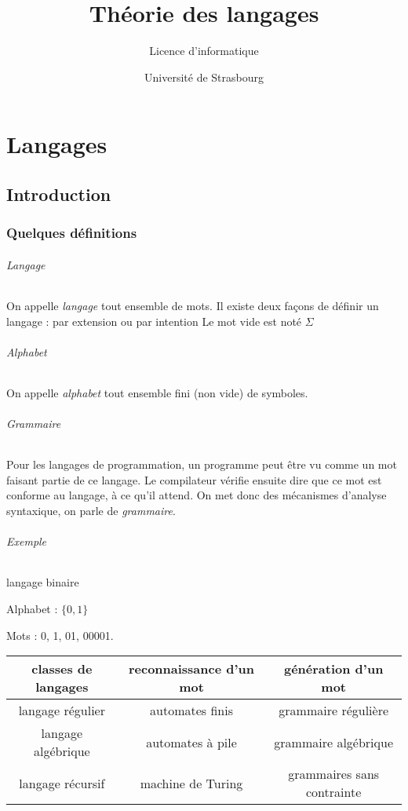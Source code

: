 \documentclass[12pt, a4paper]{report}
\title{Théorie des langages}
\author{Licence d'informatique}
\date{Université de Strasbourg}
\begin{document}
\maketitle

\part{Langages}

\chapter{Introduction}

\section*{Quelques définitions}

\paragraph{Langage} On appelle \textit{langage} tout ensemble de mots. Il existe deux façons de définir un langage : par extension ou par intention Le mot vide est noté $\Sigma$

\paragraph{Alphabet} On appelle \textit{alphabet} tout ensemble fini (non vide) de symboles.


\paragraph{Grammaire} 

Pour les langages de programmation, un programme peut être vu comme un
mot faisant partie de ce langage. Le compilateur vérifie ensuite dire
que ce mot est conforme au langage, à ce qu’il attend. On met donc des
mécanismes d’analyse syntaxique, on parle de \textit{grammaire}.


\paragraph{Exemple} langage binaire

Alphabet : $\{0, 1\}$

Mots : 0, 1, 01, 00001.


\begin{center}
\begin{tabular}{|c|c|c|}
\hline
classes de langages & reconnaissance d'un mot & génération d'un mot \\ \hline \hline
langage régulier  & automates finis & grammaire régulière \\ \hline
langage algébrique & automates à pile & grammaire algébrique \\ \hline
langage récursif & machine de Turing & grammaires sans contrainte \\
\hline
\end{tabular}
\end{center}
\end{document}
